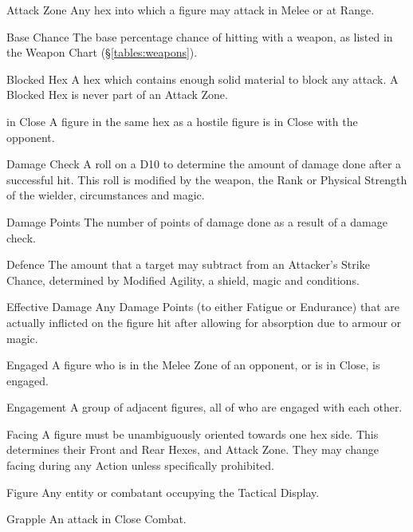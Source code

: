 \begin{multicols*}{3}
\begin{Description}
\item[Attack Zone] Any hex into which a figure may attack in Melee or at
Range.

\item[Base Chance] The base percentage chance of hitting with a weapon, as
listed in the Weapon Chart (\S\ref{tables:weapons}).

\item[Blocked Hex] A hex which contains enough solid material to block any
attack. A Blocked Hex is never part of an Attack Zone.

\item[in Close] A figure in the same hex as a hostile figure is in Close
with the opponent.

\item[Damage Check] A roll on a D10 to determine the amount of damage
done after a successful hit. This roll is modified by the weapon, the
Rank or Physical Strength of the wielder, circumstances and magic.

\item[Damage Points] The number of points of damage done as a result of a
damage check.

\item[Defence] The amount that a target may subtract from an Attacker's
Strike Chance, determined by Modified Agility, a shield, magic and
conditions.

\item[Effective Damage] Any Damage Points (to either Fatigue or Endurance)
that are actually inflicted on the figure hit after allowing for
absorption due to armour or magic.

\item[Engaged] A figure who is in the Melee Zone of an opponent, or is in
Close, is engaged.

\item[Engagement] A group of adjacent figures, all of who are engaged with
each other.

\item[Facing] A figure must be unambiguously oriented towards one hex
side. This determines their Front and Rear Hexes, and Attack
Zone. They may change facing during any Action unless specifically
prohibited.

\item[Figure] Any entity or combatant occupying the Tactical Display.

\item[Grapple] An attack in Close Combat.


\end{Description}
\end{multicols*}
